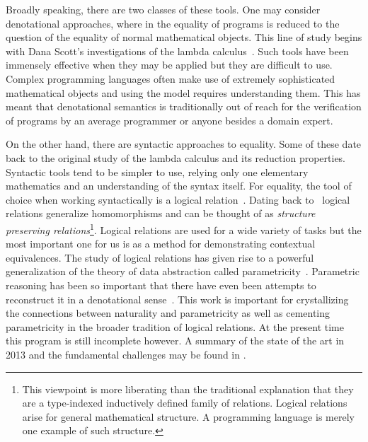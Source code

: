 Broadly speaking, there are two classes of these tools. One may
consider denotational approaches, where in the equality of programs is
reduced to the question of the equality of normal mathematical
objects. This line of study begins with Dana Scott's investigations of
the lambda calculus~\citep{Scott:76}. Such tools have been
immensely effective when they may be applied but they are difficult to
use. Complex programming languages often make use of extremely
sophisticated mathematical objects and using the model requires
understanding them. This has meant that denotational semantics is
traditionally out of reach for the verification of programs by an
average programmer or anyone besides a domain expert.

On the other hand, there are syntactic approaches to equality. Some of
these date back to the original study of the lambda calculus and its
reduction properties. Syntactic tools tend to be simpler to use,
relying only one elementary mathematics and an understanding of the
syntax itself. For equality, the tool of choice when working
syntactically is a logical
relation~\citep{Tait:67,Girard:72,Pitts:98,Appel:01,Ahmed:04,Ahmed:06,Appel:07,Dreyer:09,Dreyer:10}.
Dating back to~\citet{Tait:67} logical relations generalize
homomorphisms and can be thought of as \emph{structure preserving
  relations}\footnote{This viewpoint is more liberating than the
  traditional explanation that they are a type-indexed inductively
  defined family of relations. Logical relations arise for general
  mathematical structure. A programming language is merely one example
  of such structure.}. Logical relations are used for a wide variety
of tasks but the most important one for us is as a method for
demonstrating contextual equivalences. The study of logical relations
has given rise to a powerful generalization of the theory of data
abstraction called parametricity~\citep{Reynolds:83}. Parametric
reasoning has been so important that there have even been attempts to
reconstruct it in a denotational
sense~\citep{Bainbridge:90,Abadi:90,Ma:91,Birkedal:05,Dunphy:04}. This
work is important for crystallizing the connections between
naturality and parametricity as well as cementing parametricity in the
broader tradition of logical relations. At the present time this
program is still incomplete however. A summary of the state of the art
in 2013 and the fundamental challenges may be found in
\citet{Hermida:14}.

